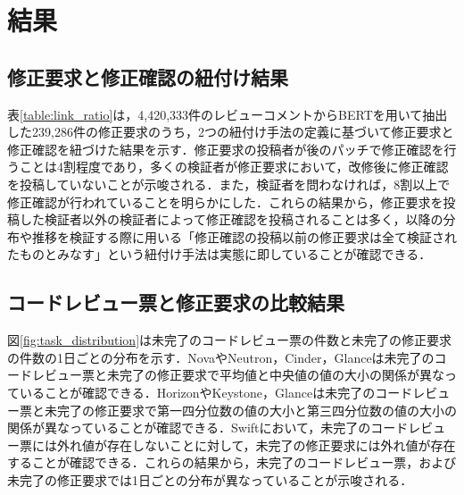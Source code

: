 \documentclass[11pt]{jreport}
\begin{document}
\section{結果}
\subsection{修正要求と修正確認の紐付け結果}
表\ref{table:link_ratio}は，4,420,333件のレビューコメントからBERTを用いて抽出した239,286件の修正要求のうち，2つの紐付け手法の定義に基づいて修正要求と修正確認を紐づけた結果を示す．修正要求の投稿者が後のパッチで修正確認を行うことは4割程度であり，多くの検証者が修正要求において，改修後に修正確認を投稿していないことが示唆される．また，検証者を問わなければ，8割以上で修正確認が行われていることを明らかにした．これらの結果から，修正要求を投稿した検証者以外の検証者によって修正確認を投稿されることは多く，以降の分布や推移を検証する際に用いる「修正確認の投稿以前の修正要求は全て検証されたものとみなす」という紐付け手法は実態に即していることが確認できる．


\subsection{コードレビュー票と修正要求の比較結果}
図\ref{fig:task_distribution}は未完了のコードレビュー票の件数と未完了の修正要求の件数の1日ごとの分布を示す．NovaやNeutron，Cinder，Glanceは未完了のコードレビュー票と未完了の修正要求で平均値と中央値の値の大小の関係が異なっていることが確認できる．HorizonやKeystone，Glanceは未完了のコードレビュー票と未完了の修正要求で第一四分位数の値の大小と第三四分位数の値の大小の関係が異なっていることが確認できる．Swiftにおいて，未完了のコードレビュー票には外れ値が存在しないことに対して，未完了の修正要求には外れ値が存在することが確認できる．これらの結果から，未完了のコードレビュー票，および未完了の修正要求では1日ごとの分布が異なっていることが示唆される．
\end{document}
